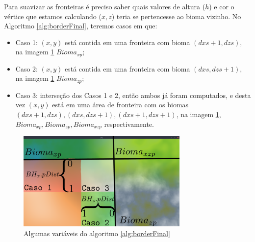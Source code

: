 Para suavizar as fronteiras é preciso saber quais valores de altura ($h$) e cor o
vértice que estamos calculando ($x, z$) teria se pertencesse ao bioma vizinho.
No Algoritmo \ref{alg:borderFinal}, teremos casos em que:
\begin{itemize}
    \item Caso 1: $(x, y)$ está contida em uma fronteira com bioma $(dxs+1, dzs)$, 
    na imagem \ref{fig:paralgborder} $Bioma_{xp}$;
    \item Caso 2: $(x, y)$ está contida em uma fronteira com bioma $(dxs, dzs+1)$, 
    na imagem \ref{fig:paralgborder} $Bioma_{zp}$;
    \item Caso 3: interseção dos Casos 1 e 2, então ambos já foram computados, 
    e desta vez $(x, y)$ está em uma área de fronteira com os biomas $(dxs+1, dzs), (dxs, dzs+1), (dxs+1, dzs+1)$, 
    na imagem \ref{fig:paralgborder}, $Bioma_{xp}, Bioma_{zp}, Bioma_{xzp}$ respectivamente.
\end{itemize}

\begin{figure}[H]
    \centering
    \includegraphics[width=0.75\textwidth]{figuras/border/yeah.png}
    \caption{Algumas variáveis do algoritmo \ref{alg:borderFinal}}
    \label{fig:paralgborder}
\end{figure}

